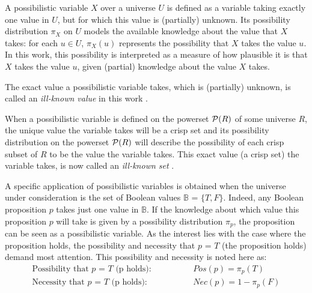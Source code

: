 \begin{definition}
A possibilistic variable $X$ over a universe $U$ is defined as a variable taking exactly one value in $U$, but for which this value is (partially) unknown. Its possibility distribution $\pi_X$ on $U$ models the available knowledge about the value that $X$ takes: for each $u\in U$, $\pi_X(u)$ represents the possibility that $X$ takes the value $u$. In this work, this possibility is interpreted as a measure of how plausible it is that $X$ takes the value $u$, given (partial) knowledge about the value $X$ takes.
\end{definition}

The exact value a possibilistic variable takes, which is (partially) unknown, is called an \emph{ill-known value} in this work \cite{Dubois88b}.

When a possibilistic variable is defined on the powerset $\mathcal{P}(R)$ of some universe $R$, the unique value the variable takes will be a crisp set and its possibility distribution on the powerset $\mathcal{P}(R)$ will describe the possibility of each crisp subset of $R$ to be the value the variable takes. This exact value (a crisp set) the variable takes, is now called an \emph{ill-known set} \cite{Dubois88b}.



A specific application of possibilistic variables is obtained when the universe under consideration is the set of Boolean values $\mathbb{B}$ = $\{T,F\}$. Indeed, any Boolean proposition $p$ takes just one value in $\mathbb{B}$. If the knowledge about which value this proposition $p$ will take is given by a possibility distribution $\pi_p$, the proposition can be seen as a possibilistic variable. As the interest lies with the case where the proposition holds, the possibility and necessity that $p$ = $T$ (the proposition holds) demand most attention. This possibility and necessity is noted here as:
\begin{align}
\text{Possibility that $p$ = $T$ (p holds):} \hspace{50pt} & Pos(p) = \pi_p(T) \label{propholdsposs} \\
\text{Necessity that $p$ = $T$ (p holds):} \hspace{50pt} & Nec(p) = 1-\pi_p(F) \label{propholdsnecc}
\end{align}

